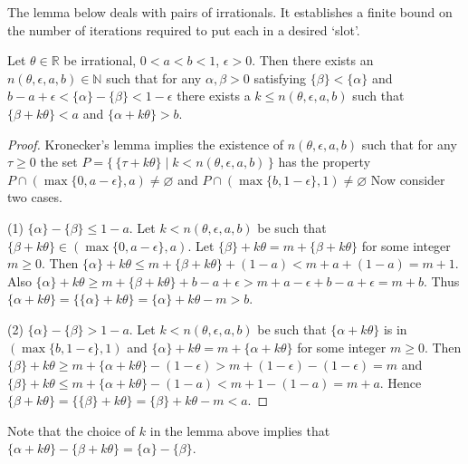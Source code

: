 \documentclass[12pt]{article}
\begin{document}
The lemma below deals with pairs of irrationals. It establishes a
finite bound on the number of iterations required to put each in a
desired `slot'.
\begin{lemma}\label{mixing}Let $\theta\in\mathbb R$ be irrational,
$0<a<b<1$, $\epsilon>0$. Then there
exists an $n(\theta,\epsilon,a,b)\in\mathbb N$ such that for any
$\alpha,\beta>0$ satisfying
$\{\beta\}<\{\alpha\}$ and
$b-a+\epsilon<\{\alpha\}-\{\beta\}<1-\epsilon$ there exists a $k\leq
n(\theta,\epsilon,a,b)$ such that $\{\beta+k\theta\}<a$ and
$\{\alpha+k\theta\}>b$.
\end{lemma}
\begin{proof}Kronecker's lemma implies the existence of
$n(\theta,\epsilon,a,b)$ such that for any $\tau\geq0$ the set 
$P=\{\,\{\tau+k\theta\}\mid k<n(\theta,\epsilon,a,b)\,\}$ has the property
$P\cap(\max\{0,a-\epsilon\},a)\not=\varnothing$ and 
$P\cap(\max\{b,1-\epsilon\},1)\not=\varnothing$ Now consider two cases. 

(1) $\{\alpha\}-\{\beta\}\leq1-a$. Let $k<n(\theta,\epsilon,a,b)$ be such 
that $\{\beta+k\theta\}\in(\max\{0,a-\epsilon\},a)$. Let
$\{\beta\}+k\theta=m+\{\beta+k\theta\}$ for some integer $m\geq0$.
Then $\{\alpha\}+k\theta\leq m+\{\beta+k\theta\}+(1-a)<m+a+(1-a)=m+1$.
Also
$\{\alpha\}+k\theta\geq m+\{\beta+k\theta\}+b-a+\epsilon>
m+a-\epsilon+b-a+\epsilon=m+b$. Thus $\{\alpha+k\theta\}=\{\{\alpha\}+k\theta\}=\{\alpha\}+k\theta-m>b$.

(2) $\{\alpha\}-\{\beta\}>1-a$. Let $k<n(\theta,\epsilon,a,b)$ be such that
$\{\alpha+k\theta\}$ is in $(\max\{b,1-\epsilon\},1)$ and
$\{\alpha\}+k\theta=m+\{\alpha+k\theta\}$ for some integer $m\geq0$.
Then
$\{\beta\}+k\theta\geq m+\{\alpha+k\theta\}-(1-\epsilon)>m+(1-\epsilon)-(1-\epsilon)=m$
and $\{\beta\}+k\theta\leq
m+\{\alpha+k\theta\}-(1-a)<m+1-(1-a)=m+a$. Hence
$\{\beta+k\theta\}=\{\{\beta\}+k\theta\}=\{\beta\}+k\theta-m<a$.
\end{proof}
Note that the choice of $k$ in the lemma above implies that
$\{\alpha+k\theta\}-\{\beta+k\theta\}=\{\alpha\}-\{\beta\}$.
\end{document}

